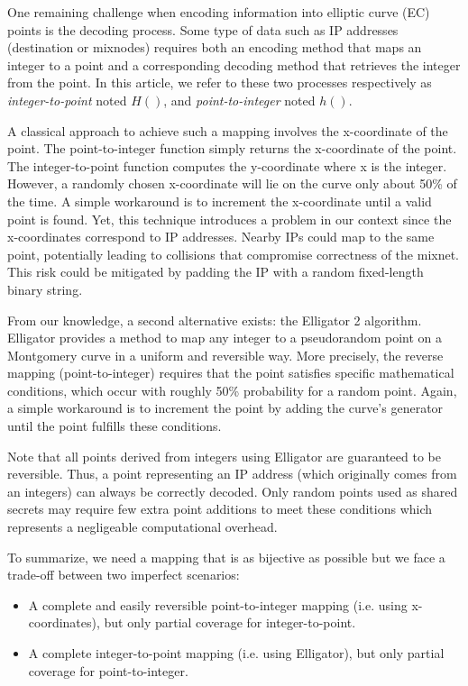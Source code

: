 One remaining challenge when encoding information into elliptic curve (EC) points is the decoding process.  
Some type of data such as IP addresses (destination or mixnodes) requires both an encoding method that maps an integer to a point and a corresponding decoding method that retrieves the integer from the point.
In this article, we refer to these two processes respectively as \textit{integer-to-point} noted $H()$, and \textit{point-to-integer} noted $h()$.
\newline

A classical approach to achieve such a mapping involves the x-coordinate of the point.
The point-to-integer function simply returns the x-coordinate of the point.
The integer-to-point function computes the y-coordinate where x is the integer.
However, a randomly chosen x-coordinate will lie on the curve only about 50\% of the time.  
A simple workaround is to increment the x-coordinate until a valid point is found.  
Yet, this technique introduces a problem in our context since the x-coordinates correspond to IP addresses. 
Nearby IPs could map to the same point, potentially leading to collisions that compromise correctness of the mixnet.
This risk could be mitigated by padding the IP with a random fixed-length binary string.
\newline

From our knowledge, a second alternative exists: the Elligator 2 algorithm.  
Elligator provides a method to map any integer to a pseudorandom point on a Montgomery curve in a uniform and reversible way.  
More precisely, the reverse mapping (point-to-integer) requires that the point satisfies specific mathematical conditions, which occur with roughly 50\% probability for a random point.  
Again, a simple workaround is to increment the point by adding the curve's generator until the point fulfills these conditions.

Note that all points derived from integers using Elligator are guaranteed to be reversible.  
Thus, a point representing an IP address (which originally comes from an integers) can always be correctly decoded.  
Only random points used as shared secrets may require few extra point additions to meet these conditions which represents a negligeable computational overhead.
\newline

To summarize, we need a mapping that is as bijective as possible but we face a trade-off between two imperfect scenarios:
\begin{itemize}
    \item A complete and easily reversible point-to-integer mapping (i.e. using x-coordinates), but only partial coverage for integer-to-point.
    \item A complete integer-to-point mapping (i.e. using Elligator), but only partial coverage for point-to-integer.
\end{itemize}

